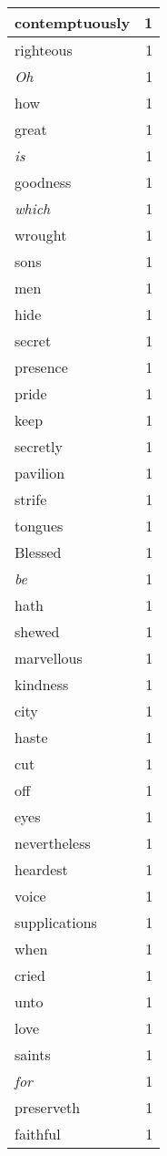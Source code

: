 \begin{center}
\begin{longtable}{l|r}
contemptuously & 1 \\ \hline
righteous & 1 \\ \hline
\emph{Oh} & 1 \\ \hline
how & 1 \\ \hline
great & 1 \\ \hline
\emph{is} & 1 \\ \hline
goodness & 1 \\ \hline
\emph{which} & 1 \\ \hline
wrought & 1 \\ \hline
sons & 1 \\ \hline
men & 1 \\ \hline
hide & 1 \\ \hline
secret & 1 \\ \hline
presence & 1 \\ \hline
pride & 1 \\ \hline
keep & 1 \\ \hline
secretly & 1 \\ \hline
pavilion & 1 \\ \hline
strife & 1 \\ \hline
tongues & 1 \\ \hline
Blessed & 1 \\ \hline
\emph{be} & 1 \\ \hline
hath & 1 \\ \hline
shewed & 1 \\ \hline
marvellous & 1 \\ \hline
kindness & 1 \\ \hline
city & 1 \\ \hline
haste & 1 \\ \hline
cut & 1 \\ \hline
off & 1 \\ \hline
eyes & 1 \\ \hline
nevertheless & 1 \\ \hline
heardest & 1 \\ \hline
voice & 1 \\ \hline
supplications & 1 \\ \hline
when & 1 \\ \hline
cried & 1 \\ \hline
unto & 1 \\ \hline
love & 1 \\ \hline
saints & 1 \\ \hline
\emph{for} & 1 \\ \hline
preserveth & 1 \\ \hline
faithful & 1 \\ \hline

\end{longtable}
\end{center}
